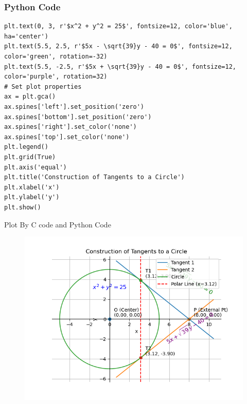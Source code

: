 \documentclass{beamer}
\begin{document}
\begin{frame}[fragile]
\frametitle{Python Code}
\begin{lstlisting}
plt.text(0, 3, r'$x^2 + y^2 = 25$', fontsize=12, color='blue', ha='center')
plt.text(5.5, 2.5, r'$5x - \sqrt{39}y - 40 = 0$', fontsize=12, color='green', rotation=-32)
plt.text(5.5, -2.5, r'$5x + \sqrt{39}y - 40 = 0$', fontsize=12, color='purple', rotation=32)
# Set plot properties
ax = plt.gca()
ax.spines['left'].set_position('zero')
ax.spines['bottom'].set_position('zero')
ax.spines['right'].set_color('none')
ax.spines['top'].set_color('none')
plt.legend()
plt.grid(True)
plt.axis('equal')
plt.title('Construction of Tangents to a Circle')
plt.xlabel('x')
plt.ylabel('y')
plt.show()
\end{lstlisting}
\end{frame}
\begin{frame}{Plot By C code and Python Code}
    \begin{figure}
    \centering
    \caption{}
    \includegraphics[width=0.7\columnwidth]{figs/Figure_1.png}
    \label{fig:placeholder}
\end{figure}
\end{frame}
\end{document}
